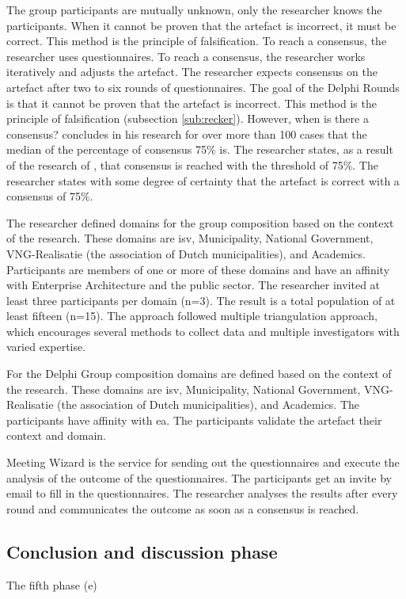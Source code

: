 The group participants are mutually unknown, only the researcher knows the participants. When it cannot be proven that the artefact is incorrect, it must be correct. This method is the principle of falsification. To reach a consensus, the researcher uses questionnaires. To reach a consensus, the researcher works iteratively and adjusts the artefact. The researcher expects consensus on the artefact after two to six rounds of questionnaires. The goal of the Delphi Rounds is that it cannot be proven that the artefact is incorrect. This method is the principle of falsification (subsection \ref{sub:recker}). However, when is there a consensus? \textcite[p. 404]{Diamond2014} concludes in his research for over more than 100 cases that the median of the percentage of consensus 75\% is. The researcher states, as a result of the research of \textcite{Diamond2014}, that consensus is reached with the threshold of 75\%. The researcher states with some degree of certainty that the artefact is correct with a consensus of 75\%.

The researcher defined domains for the group composition based on the context of the research. These domains are \acrfull{isv}, Municipality, National Government, VNG-Realisatie (the association of Dutch municipalities), and Academics. Participants are members of one or more of these domains and have an affinity with Enterprise Architecture and the public sector. The researcher invited at least three participants per domain (n=3). The result is a total population of at least fifteen (n=15). The approach followed \textcite{Denzin2017} multiple triangulation approach, which encourages several methods to collect data and multiple investigators with varied expertise.

For the Delphi Group composition domains are defined based on the context of the research. These domains are \acrfull{isv}, Municipality, National Government, VNG-Realisatie (the association of Dutch municipalities), and Academics. The participants have affinity with \acrshort{ea}. The participants validate the artefact their context and domain.

Meeting Wizard is the service for sending out the questionnaires and execute the analysis of the outcome of the questionnaires. The participants get an invite by email to fill in the questionnaires. The researcher analyses the results after every round and communicates the outcome as soon as a consensus is reached.

\subsection{Conclusion and discussion phase}
\label{sub:conclusionanddiscussinophase}
The fifth phase (e)

